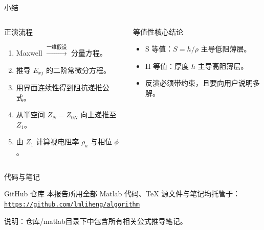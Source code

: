 \documentclass[10pt,aspectratio=169,fontset=none]{ctexbeamer}
\begin{document}
    \begin{frame}{小结}
        \begin{columns}
            \begin{block}{正演流程}
                \begin{enumerate}
                    \item Maxwell $\xrightarrow{\text{一维假设}}$ 分量方程。
                    \item 推导 $E_{xj}$ 的二阶常微分方程。
                    \item 用界面连续性得到阻抗递推公式。
                    \item 从半空间 $Z_N=Z_{0N}$ 向上递推至 $Z_1$。
                    \item 由 $Z_1$ 计算视电阻率 $\rho_a$ 与相位 $\phi$。
                \end{enumerate}
            \end{block}

            \begin{block}{等值性核心结论}
                \begin{itemize}
                    \item S 等值：$S=h/\rho$ 主导低阻薄层。
                    \item H 等值：厚度 $h$ 主导高阻薄层。
                    \item 反演必须带约束，且要向用户说明多解。
                \end{itemize}
            \end{block}
        \end{columns}
    \end{frame}

    \begin{frame}{代码与笔记}
        \centering
        \vspace{2em}
        \begin{tblock}{GitHub 仓库}
            本报告所用全部 Matlab 代码、TeX 源文件与笔记均托管于：
            \centering
            \vspace{0.6em}
            \href{https://github.com/lmliheng/algorithm}{\texttt{\textcolor{primary}{https://github.com/lmliheng/algorithm}}}
        \end{tblock}
        \vspace{2em}
        \small \textcolor{primary}{说明}：仓库/matlab目录下中包含所有相关公式推导笔记。
    \end{frame}

\end{document}
